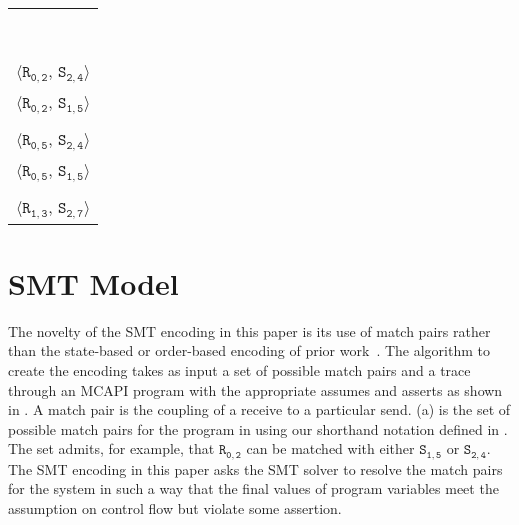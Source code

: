 \newsavebox{\boxMP}
\begin{lrbox}{\boxMP}
\normalsize
\begin{tabular}[t]{l}
\\\\\\\\\\\\\\\\\\
$\langle\mathtt{R_{0,2}}$, $\mathtt{S_{2,4}}\rangle$\\
$\langle\mathtt{R_{0,2}}$, $\mathtt{S_{1,5}}\rangle$\\
\\
$\langle\mathtt{R_{0,5}}$, $\mathtt{S_{2,4}}\rangle$\\
$\langle\mathtt{R_{0,5}}$, $\mathtt{S_{1,5}}\rangle$\\
\\
$\langle\mathtt{R_{1,3}}$, $\mathtt{S_{2,7}}\rangle$\\
\end{tabular}
\end{lrbox}




\section{SMT Model}\label{sec:smt}


The novelty of the SMT encoding in this paper is its use of match pairs rather than the state-based or order-based encoding of prior work~\cite{elwakil:padtad10,elwakil:atva10}. The algorithm to create the encoding takes as input a set of possible match pairs and a trace through an MCAPI program with the appropriate assumes and asserts as shown in . A match pair is the coupling of a receive to a particular send. (a) is the set of possible match pairs for the program in  using our shorthand notation defined in . The set admits, for example, that $\mathtt{R_{0,2}}$ can be matched with either $\mathtt{S_{1,5}}$ or $\mathtt{S_{2,4}}$. The SMT encoding in this paper asks the SMT solver to resolve the match pairs for the system in such a way that the final values of program variables meet the assumption on control flow but violate some assertion.

